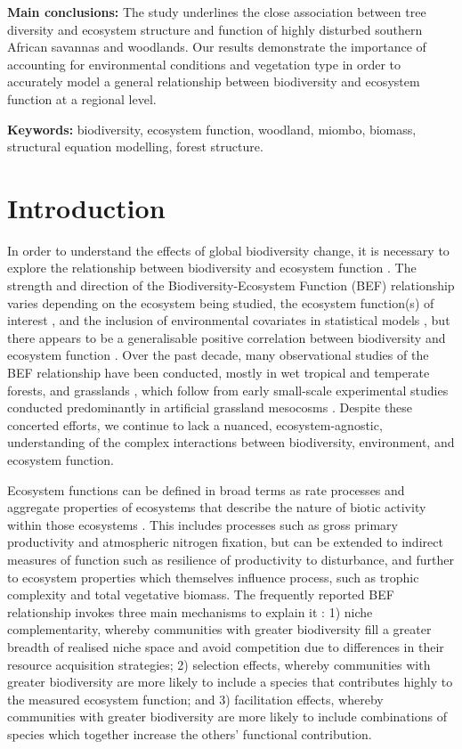 \documentclass[11pt,a4paper]{article}
\begin{document}
\textbf{Main conclusions:} The study underlines the close association between tree diversity and ecosystem structure and function of highly disturbed southern African savannas and woodlands. Our results demonstrate the importance of accounting for environmental conditions and vegetation type in order to accurately model a general relationship between biodiversity and ecosystem function at a regional level. 

\textbf{Keywords:} biodiversity, ecosystem function, woodland, miombo, biomass, structural equation modelling, forest structure.

\section{Introduction}

In order to understand the effects of global biodiversity change, it is necessary to explore the relationship between biodiversity and ecosystem function \citep{Tilman2014}. The strength and direction of the Biodiversity-Ecosystem Function (BEF) relationship varies depending on the ecosystem being studied, the ecosystem function(s) of interest \citep{Hector2007}, and the inclusion of environmental covariates in statistical models \citep{Vila2005}, but there appears to be a generalisable positive correlation between biodiversity and ecosystem function \citep{Liang2016, Hooper2012, Cardinale2009}. Over the past decade, many observational studies of the BEF relationship have been conducted, mostly in wet tropical and temperate forests, and grasslands \citep{Chen2011}, which follow from early small-scale experimental studies conducted predominantly in artificial grassland mesocosms \citep{Tilman1994, Tilman2014}. Despite these concerted efforts, we continue to lack a nuanced, ecosystem-agnostic, understanding of the complex interactions between biodiversity, environment, and ecosystem function.

Ecosystem functions can be defined in broad terms as rate processes and aggregate properties of ecosystems that describe the nature of biotic activity within those ecosystems \citep{Jax2005}. This includes processes such as gross primary productivity and atmospheric nitrogen fixation, but can be extended to indirect measures of function such as resilience of productivity to disturbance, and further to ecosystem properties which themselves influence process, such as trophic complexity and total vegetative biomass. The frequently reported BEF relationship invokes three main mechanisms to explain it \citep{Tilman2014}: 1) niche complementarity, whereby communities with greater biodiversity fill a greater breadth of realised niche space and avoid competition due to differences in their resource acquisition strategies; 2) selection effects, whereby communities with greater biodiversity are more likely to include a species that contributes highly to the measured ecosystem function; and 3) facilitation effects, whereby communities with greater biodiversity are more likely to include combinations of species which together increase the others' functional contribution.
\end{document}
